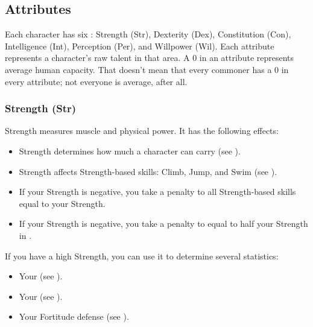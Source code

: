     \subsection{Attributes}\label{Attributes}

        Each character has six : Strength (Str), Dexterity (Dex), Constitution (Con), Intelligence (Int), Perception (Per), and Willpower (Wil).
        Each attribute represents a character's raw talent in that area.
        A 0 in an attribute represents average human capacity.
        That doesn't mean that every commoner has a 0 in every attribute; not everyone is average, after all.

        \subsubsection{Strength (Str)}\label{Strength}
            Strength measures muscle and physical power.
            It has the following effects:
            \begin{itemize}
                \item Strength determines how much a character can carry (see ).
                \item Strength affects Strength-based skills: Climb, Jump, and Swim (see ).
                \item If your Strength is negative, you take a penalty to all Strength-based skills equal to your Strength.
                \item If your Strength is negative, you take a penalty to  equal to half your Strength in .
            \end{itemize}

            If you have a high Strength, you can use it to determine several statistics:
            \begin{itemize}
                \item Your  (see ).
                \item Your  (see ).
                \item Your Fortitude defense (see ).
            \end{itemize}

